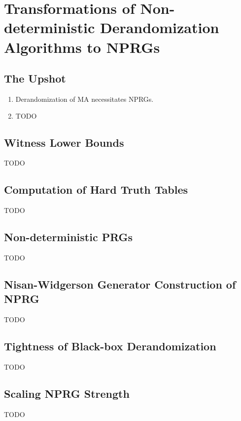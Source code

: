 \chapter{Transformations of Non-deterministic Derandomization Algorithms to NPRGs}
\label{lec:13}

\section*{The Upshot}

\begin{enumerate}
  \item Derandomization of MA necessitates NPRGs.
  \item TODO
\end{enumerate}

\section{Witness Lower Bounds}

TODO

\section{Computation of Hard Truth Tables}

TODO

\section{Non-deterministic PRGs}

TODO

\section{Nisan-Widgerson Generator Construction of NPRG}

TODO

\section{Tightness of Black-box Derandomization}

TODO

\section{Scaling NPRG Strength}

TODO
